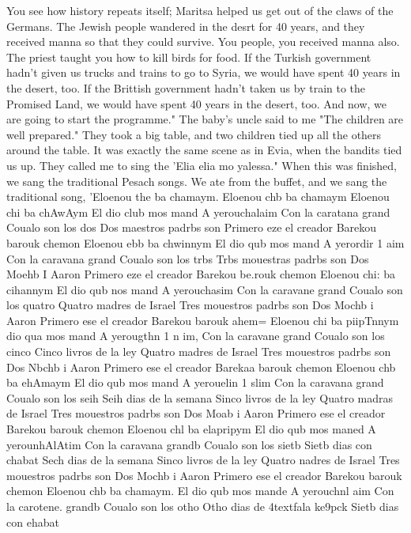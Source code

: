 {You see how history repeats itself; Maritsa helped 
us get out of the claws of the Germans.
The Jewish people wandered in the desrt for 40 
years, and they received manna so that they could survive.
You people, you received manna 
also.
The priest taught you how to kill birds for food.
If the Turkish government hadn't 
given us trucks and trains to go to Syria, we would have spent 40 years in the desert, too.
If the Brittish government hadn't taken us by train to the Promised Land, we would have 
spent 40 years in the desert, too.
And now, we are going to start the programme."
The baby's uncle said to me "The children are well prepared."
They took a big table, 
and two children tied up all the others around the table.
It was exactly the same scene 
as in Evia, when the bandits tied us up.
They called me to sing the 'Elia elia mo yalessa."
When this was finished, we sang the traditional Pesach songs.
We ate from the buffet, 
and we sang the traditional song, 'Eloenou the ba chamaym.
Eloenou chb ba chamaym 
Eloenou chi ba chAwAym 
El dio club mos mand 
A yerouchalaim 
Con la caratana grand 
Coualo son los dos 
Dos maestros padrbs son 
Primero eze el creador 
Barekou barouk chemon 
Eloenou ebb ba chwinnym 
El dio qub mos mand 
A yerordir 1 aim 
Con la caravana grand 
Coualo son los trbs 
Trbs mouestras padrbs son 
Dos Moehb I Aaron 
Primero eze el creador 
Barekou be.rouk chemon 
Eloenou chi: ba cihannym 
El dio qub nos mand 
A yerouchasim 
Con la caravane grand 
Coualo son los quatro 
Quatro madres de Israel 
Tres mouestros padrbs son 
Dos Mochb i Aaron 
Primero ese el creador 
Barekou barouk ahem= 
Eloenou chi ba piipTnnym 
dio qua mos mand 
A yerougthn 1 n im, 
Con la caravane grand 
Coualo son los cinco 
Cinco livros de la ley 
Quatro madres de Israel 
Tres mouestros padrbs son 
Dos Nbchb i Aaron 
Primero ese el creador 
Barekaa barouk chemon 
Eloenou chb ba ehAmaym 
El dio qub mos mand 
A yerouelin 1 slim 
Con la caravana grand 
Coualo son los seih 
Seih dias de la semana 
Sinco livros de la ley 
Quatro madras de Israel 
Tres mouestros padrbs son 
Dos Moab i Aaron 
Primero ese el creador 
Barekou barouk chemon 
Eloenou chl ba elapripym 
El dio qub mos maned 
A yerounhAlAtim 
Con la caravana grandb 
Coualo son los sietb 
Sietb dias con chabat 
Sech dias de la semana 
Sinco livros de la ley 
Quatro nadres de Israel 
Tres mouestros padrbs son 
Dos Mochb i Aaron 
Primero ese el creador 
Barekou barouk chemon 
Eloenou chb ba chamaym.
El dio qub mos mande 
A yerouchnl aim 
Con la carotene.
grandb 
Coualo son los otho 
Otho dias de 4textfala ke9pck 
Sietb dias con ehabat 
}
